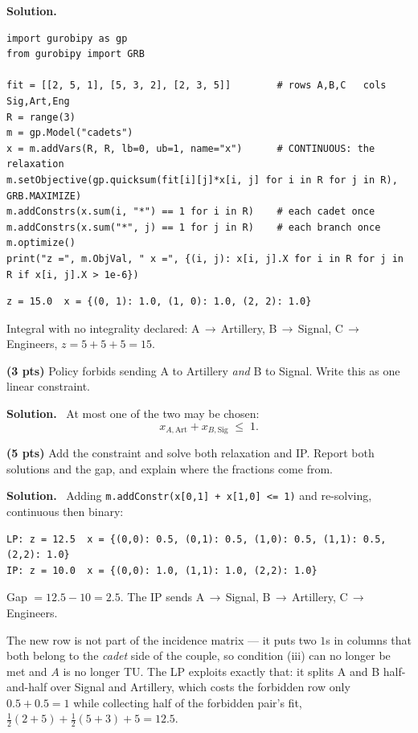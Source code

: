 \documentclass[10pt]{article}
\newenvironment{solution}
  {\par\smallskip\begingroup\color{solink}\textbf{Solution.}\ }
  {\endgroup\par}
\begin{document}
\begin{parts}
\begin{solution}
\begin{lstlisting}
import gurobipy as gp
from gurobipy import GRB

fit = [[2, 5, 1], [5, 3, 2], [2, 3, 5]]        # rows A,B,C   cols Sig,Art,Eng
R = range(3)
m = gp.Model("cadets")
x = m.addVars(R, R, lb=0, ub=1, name="x")      # CONTINUOUS: the relaxation
m.setObjective(gp.quicksum(fit[i][j]*x[i, j] for i in R for j in R), GRB.MAXIMIZE)
m.addConstrs(x.sum(i, "*") == 1 for i in R)    # each cadet once
m.addConstrs(x.sum("*", j) == 1 for j in R)    # each branch once
m.optimize()
print("z =", m.ObjVal, " x =", {(i, j): x[i, j].X for i in R for j in R if x[i, j].X > 1e-6})
\end{lstlisting}
\begin{lstlisting}
z = 15.0  x = {(0, 1): 1.0, (1, 0): 1.0, (2, 2): 1.0}
\end{lstlisting}
Integral with no integrality declared: A\,$\to$\,Artillery, B\,$\to$\,Signal,
C\,$\to$\,Engineers, $z = 5 + 5 + 5 = 15$.
\end{solution}

\item \textbf{(3 pts)} Policy forbids sending A to Artillery \emph{and} B to Signal.
  Write this as one linear constraint.

\begin{solution}
At most one of the two may be chosen:
\[
  x_{A,\mathrm{Art}} + x_{B,\mathrm{Sig}} \;\le\; 1 .
\]
\end{solution}

\item \textbf{(5 pts)} Add the constraint and solve both relaxation and IP. Report both
  solutions and the gap, and explain where the fractions come from.

\begin{solution}
Adding \texttt{m.addConstr(x[0,1] + x[1,0] <= 1)} and re-solving, continuous then binary:
\begin{lstlisting}
LP: z = 12.5  x = {(0,0): 0.5, (0,1): 0.5, (1,0): 0.5, (1,1): 0.5, (2,2): 1.0}
IP: z = 10.0  x = {(0,0): 1.0, (1,1): 1.0, (2,2): 1.0}
\end{lstlisting}
Gap $= 12.5 - 10 = 2.5$. The IP sends A\,$\to$\,Signal, B\,$\to$\,Artillery,
C\,$\to$\,Engineers.

The new row is not part of the incidence matrix --- it puts two $1$s in columns that both
belong to the \emph{cadet} side of the couple, so condition (iii) can no longer be met and
$A$ is no longer TU. The LP exploits exactly that: it splits A and B half-and-half over
Signal and Artillery, which costs the forbidden row only $0.5 + 0.5 = 1$ while collecting
half of the forbidden pair's fit, $\tfrac12(2+5) + \tfrac12(5+3) + 5 = 12.5$.
\end{solution}
\end{parts}
\end{document}
